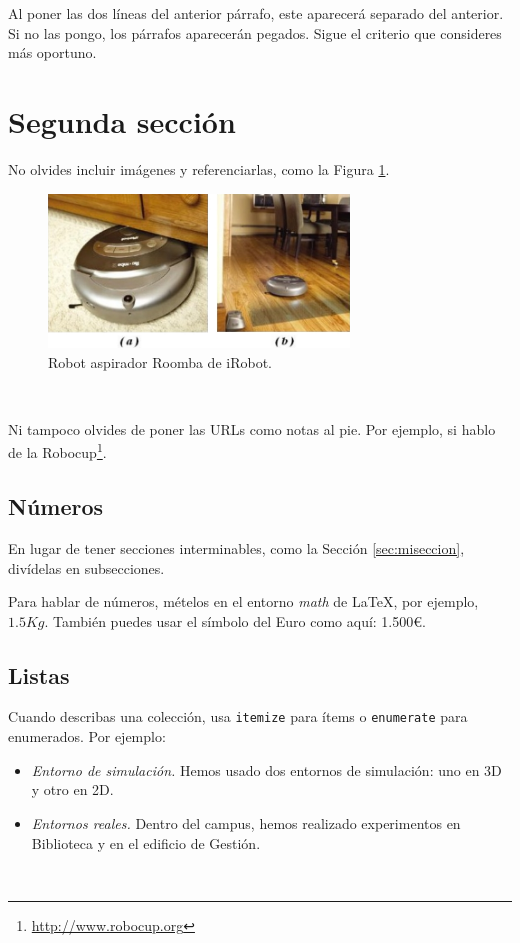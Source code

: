 Al poner las dos líneas del anterior párrafo, este aparecerá separado del anterior. Si no las pongo, los párrafos aparecerán pegados. Sigue el criterio que consideres más oportuno.

\section{Segunda sección}
\label{sec:segundaseccion}

No olvides incluir imágenes y referenciarlas, como la Figura \ref{fig:roomba}.

\begin{figure} [h!]
  \begin{center}
    \includegraphics[width=8cm]{figs/roomba}
  \end{center}
  \caption{Robot aspirador Roomba de iRobot.}
  \label{fig:roomba}
\end{figure}\

Ni tampoco olvides de poner las URLs como notas al pie. Por ejemplo, si hablo de la Robocup\footnote{\url{http://www.robocup.org}}.

\subsection{Números}
\label{sec:subseccion}

En lugar de tener secciones interminables, como la Sección \ref{sec:miseccion}, divídelas en subsecciones.

Para hablar de números, mételos en el entorno \textit{math} de \LaTeX, por ejemplo, $1.5Kg$. También puedes usar el símbolo del Euro como aquí: 1.500\euro.

\subsection{Listas}

Cuando describas una colección, usa \texttt{itemize} para ítems o \texttt{enumerate} para enumerados. Por ejemplo:

\begin{itemize}
 \item \textit{Entorno de simulación.} Hemos usado dos entornos de simulación: uno en 3D y otro en 2D.
 \item \textit{Entornos reales.} Dentro del campus, hemos realizado experimentos en Biblioteca y en el edificio de Gestión.
\end{itemize}\

